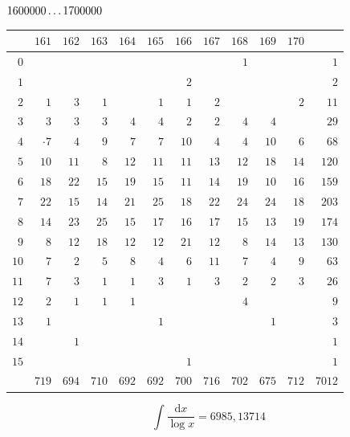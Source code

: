 \clearpage
\noindent\begin{minipage}{\linewidth}\centering
{}
\(1600000\mathinner{.\,.\,.}1700000\)\par\smallskip
\begingroup\fontsize{10.5}{11.5}\selectfont\setlength{\tabcolsep}{3.5pt}\renewcommand{\arraystretch}{1}
\begin{tabular}{r|rrrrrrrrrr|r}\hline
 & $161$ & $162$ & $163$ & $164$ & $165$ & $166$ & $167$ & $168$ & $169$ & $170$ &  \\ \hline
$0$ &  &  &  &  &  &  &  & $1$ &  &  & $1$ \\
$1$ &  &  &  &  &  & $2$ &  &  &  &  & $2$ \\
$2$ & $1$ & $3$ & $1$ &  & $1$ & $1$ & $2$ &  &  & $2$ & $11$ \\
$3$ & $3$ & $3$ & $3$ & $4$ & $4$ & $2$ & $2$ & $4$ & $4$ &  & $29$ \\
$4$ & $\mathord{\cdot}\!7$ & $4$ & $9$ & $7$ & $7$ & $10$ & $4$ & $4$ & $10$ & $6$ & $68$ \\
$5$ & $10$ & $11$ & $8$ & $12$ & $11$ & $11$ & $13$ & $12$ & $18$ & $14$ & $120$ \\
$6$ & $18$ & $22$ & $15$ & $19$ & $15$ & $11$ & $14$ & $19$ & $10$ & $16$ & $159$ \\
$7$ & $22$ & $15$ & $14$ & $21$ & $25$ & $18$ & $22$ & $24$ & $24$ & $18$ & $203$ \\
$8$ & $14$ & $23$ & $25$ & $15$ & $17$ & $16$ & $17$ & $15$ & $13$ & $19$ & $174$ \\
$9$ & $8$ & $12$ & $18$ & $12$ & $12$ & $21$ & $12$ & $8$ & $14$ & $13$ & $130$ \\
$10$ & $7$ & $2$ & $5$ & $8$ & $4$ & $6$ & $11$ & $7$ & $4$ & $9$ & $63$ \\
$11$ & $7$ & $3$ & $1$ & $1$ & $3$ & $1$ & $3$ & $2$ & $2$ & $3$ & $26$ \\
$12$ & $2$ & $1$ & $1$ & $1$ &  &  &  & $4$ &  &  & $9$ \\
$13$ & $1$ &  &  &  & $1$ &  &  &  & $1$ &  & $3$ \\
$14$ &  & $1$ &  &  &  &  &  &  &  &  & $1$ \\
$15$ &  &  &  &  &  & $1$ &  &  &  &  & $1$ \\
\hline
 & $719$ & $694$ & $710$ & $692$ & $692$ & $700$ & $716$ & $702$ & $675$ & $712$ & $7012$ \\ \hline
\end{tabular}\par\endgroup
\setlength{\abovedisplayskip}{6pt}\setlength{\belowdisplayskip}{4pt}
\[\int\frac{\mathrm{d}x}{\log x}=6985{,}13714\]
\end{minipage}

